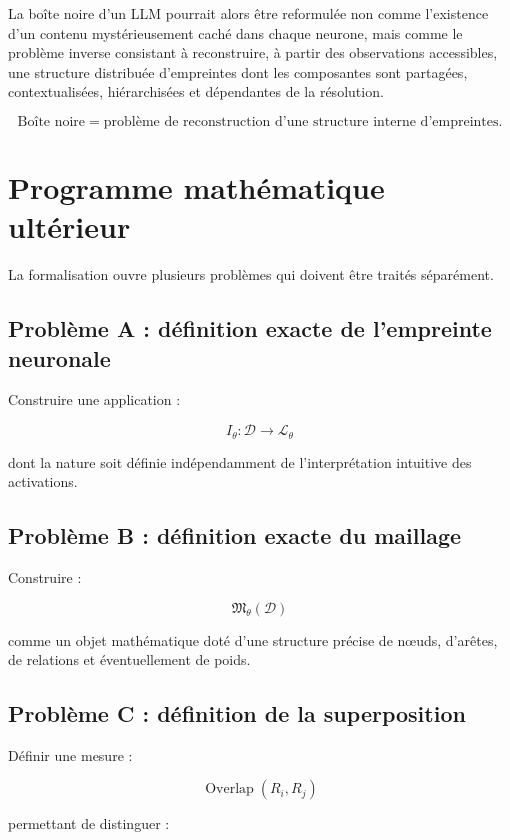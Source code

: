 \documentclass[11pt,a4paper]{article}
\newcommand{\D}{\mathcal D}
\begin{document}
La boîte noire d'un LLM pourrait alors être reformulée non comme l'existence
d'un contenu mystérieusement caché dans chaque neurone, mais comme le
problème inverse consistant à reconstruire, à partir des observations
accessibles, une structure distribuée d'empreintes dont les composantes sont
partagées, contextualisées, hiérarchisées et dépendantes de la résolution.

\[
\boxed{
\text{Boîte noire}
=
\text{problème de reconstruction d'une structure interne d'empreintes}.
}
\]

\section{Programme mathématique ultérieur}

La formalisation ouvre plusieurs problèmes qui doivent être traités
séparément.

\subsection{Problème A : définition exacte de l'empreinte neuronale}

Construire une application :

\[
I_\theta:
\D
\rightarrow
\mathcal L_\theta
\]

dont la nature soit définie indépendamment de l'interprétation intuitive
des activations.

\subsection{Problème B : définition exacte du maillage}

Construire :

\[
\mathfrak M_\theta(\D)
\]

comme un objet mathématique doté d'une structure précise de nœuds, d'arêtes,
de relations et éventuellement de poids.

\subsection{Problème C : définition de la superposition}

Définir une mesure :

\[
\operatorname{Overlap}(R_i,R_j)
\]

permettant de distinguer :
\end{document}
